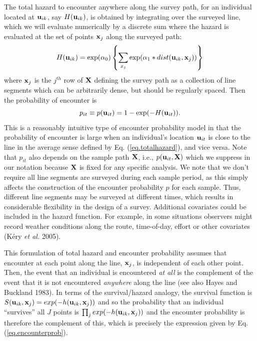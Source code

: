 The total hazard to encounter anywhere along the survey path, for an
individual located at ${\bf u}_{ik}$, say $H({\bf u}_{ik})$, is
obtained by integrating over the surveyed line, which we will evaluate
numerically by a discrete sum where the hazard is evaluated at the set
of points ${\bf x}_{j}$ along the surveyed path:
\begin{equation}
H({\bf u}_{ik}) =  \exp(\alpha_{0}) \left\{ \sum_{x_{j}}  \exp(\alpha_{1}*dist({\bf
    u}_{ik},{\bf x}_{j})) \right\}
\label{eq.totalhazard}
\end{equation}
where ${\bf x}_{j}$ is the $j^{th}$ row of ${\bf X}$ defining the
survey path as a collection of line segments which can be arbitrarily
dense, but should be regularly spaced.  Then the probability of
encounter is
\begin{equation}
p_{it} \equiv p({\bf u}_{it}) = 1- \exp(-H({\bf u}_{it})).
\label{eq.encounterprob}
\end{equation}
This is a reasonably intuitive type of encounter probability model in
that the probability of encounter is large when an individual's
location ${\bf u}_{it}$ is close to the line in the average sense
defined by Eq. (\ref{eq.totalhazard}), and vice versa. Note that
$p_{it}$ also depends on the sample path ${\bf X}$, i.e., $p({\bf
  u}_{it}, {\bf X})$ which we suppress in our notation because ${\bf
  X}$ is fixed for any specific analysis.  We note that we don't
require all line segments are surveyed during each sample period, as
this simply affects the construction of the encounter probability $p$
for each sample. Thus, different line segments may be surveyed at
different times, which results in considerable flexibility in the
design of a survey. Additional covariates could be included in the
hazard function. For example, in some situations observers might
record weather conditions along the route, time-of-day, effort or
other covariates (K\'{e}ry {\it et al.} 2005).

This formulation of total hazard and encounter probability assumes
that encounter at each point along the line, ${\bf x}_{j}$, is
independent of each other point. Then, the event that an individual is
encountered {\it at all} is the complement of the event that it is not
encountered {\it anywhere} along the line (see also Hayes and Buckland
1983).  In terms of the survival/hazard analogy, the survival function
is $S({\bf u}_{ik},{\bf x}_{j}) = exp(-h({\bf u}_{ik},{\bf x}_{j}))$
and so the probability that an individual ``survives'' all $J$ points
is $\prod_{j} exp(-h({\bf u}_{ik},{\bf x}_{j}))$ and the encounter
probability is therefore the complement of this, which is precisely
the expression given by Eq. (\ref{eq.encounterprob}).

